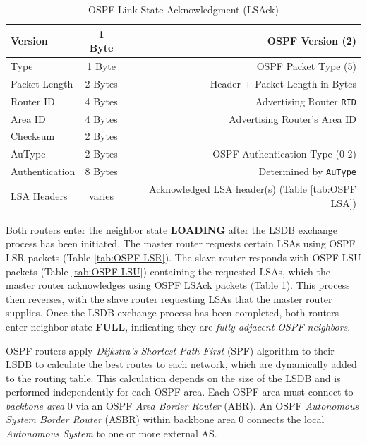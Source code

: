 \documentclass[12pt]{article}
\begin{document}
	\begin{table}[H]
	\centering
	\caption{OSPF Link-State Acknowledgment (LSAck) \label{tab:OSPF LSACK}}
	\begin{tabular}{| l | c | r |}
	\hline
	Version		& 1 Byte	& OSPF Version (2)\\\hline
	Type			& 1 Byte	& OSPF Packet Type (5)\\\hline
	Packet Length	& 2 Bytes	& Header + Packet Length in Bytes\\\hline
	Router ID		& 4 Bytes	& Advertising Router \texttt{RID}\\\hline
	Area ID		& 4 Bytes	& Advertising Router's Area ID\\\hline
	Checksum		& 2 Bytes	&\\\hline
	AuType		& 2 Bytes	& OSPF Authentication Type (0-2)\\\hline
	Authentication	& 8 Bytes	& Determined by \texttt{AuType}\\\hline
	LSA Headers	& varies	& Acknowledged LSA header(s) (Table \ref{tab:OSPF LSA})\\\hline
	\end{tabular}\end{table}
	Both routers enter the neighbor state \textbf{LOADING} after the LSDB exchange process has been initiated. The master router requests certain LSAs using OSPF LSR packets (Table \ref{tab:OSPF LSR}). The slave router responds with OSPF LSU packets (Table \ref{tab:OSPF LSU}) containing the requested LSAs, which the master router acknowledges using OSPF LSAck packets (Table \ref{tab:OSPF LSACK}). This process then reverses, with the slave router requesting LSAs that the master router supplies. Once the LSDB exchange process has been completed, both routers enter neighbor state \textbf{FULL}, indicating they are \textit{fully-adjacent OSPF neighbors}.

	OSPF routers apply \textit{Dijkstra's Shortest-Path First} (SPF) algorithm to their LSDB to calculate the best routes to each network, which are dynamically added to the routing table. This calculation depends on the size of the LSDB and is performed independently for each OSPF area. Each OSPF area must connect to \textit{backbone area} 0 via an OSPF \textit{Area Border Router} (ABR). An OSPF \textit{Autonomous System Border Router} (ASBR) within backbone area 0 connects the local \textit{Autonomous System} to one or more external AS.
\end{document}
